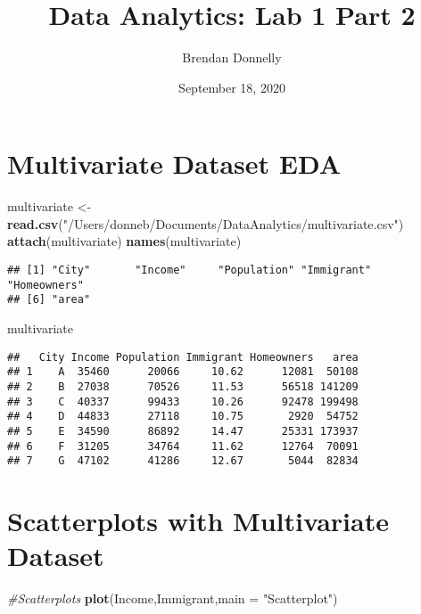 \documentclass[
]{article}
\title{Data Analytics: Lab 1 Part 2}
\author{Brendan Donnelly}
\date{September 18, 2020}
\newenvironment{Shaded}{\begin{snugshade}}{\end{snugshade}}
\newcommand{\CommentTok}[1]{\textcolor[rgb]{0.56,0.35,0.01}{\textit{#1}}}
\newcommand{\DataTypeTok}[1]{\textcolor[rgb]{0.13,0.29,0.53}{#1}}
\newcommand{\KeywordTok}[1]{\textcolor[rgb]{0.13,0.29,0.53}{\textbf{#1}}}
\newcommand{\NormalTok}[1]{#1}
\newcommand{\StringTok}[1]{\textcolor[rgb]{0.31,0.60,0.02}{#1}}
\begin{document}
\maketitle

\hypertarget{multivariate-dataset-eda}{%
\section{Multivariate Dataset EDA}\label{multivariate-dataset-eda}}

\begin{Shaded}
\begin{Highlighting}[]
\NormalTok{multivariate <-}\KeywordTok{read.csv}\NormalTok{(}\StringTok{"/Users/donneb/Documents/DataAnalytics/multivariate.csv"}\NormalTok{)}
\KeywordTok{attach}\NormalTok{(multivariate)}
\KeywordTok{names}\NormalTok{(multivariate)}
\end{Highlighting}
\end{Shaded}

\begin{verbatim}
## [1] "City"       "Income"     "Population" "Immigrant"  "Homeowners"
## [6] "area"
\end{verbatim}

\begin{Shaded}
\begin{Highlighting}[]
\NormalTok{multivariate}
\end{Highlighting}
\end{Shaded}

\begin{verbatim}
##   City Income Population Immigrant Homeowners   area
## 1    A  35460      20066     10.62      12081  50108
## 2    B  27038      70526     11.53      56518 141209
## 3    C  40337      99433     10.26      92478 199498
## 4    D  44833      27118     10.75       2920  54752
## 5    E  34590      86892     14.47      25331 173937
## 6    F  31205      34764     11.62      12764  70091
## 7    G  47102      41286     12.67       5044  82834
\end{verbatim}

\hypertarget{scatterplots-with-multivariate-dataset}{%
\section{Scatterplots with Multivariate
Dataset}\label{scatterplots-with-multivariate-dataset}}

\begin{Shaded}
\begin{Highlighting}[]
\CommentTok{#Scatterplots}
\KeywordTok{plot}\NormalTok{(Income,Immigrant,}\DataTypeTok{main =} \StringTok{"Scatterplot"}\NormalTok{)}
\end{Highlighting}
\end{Shaded}
\end{document}
